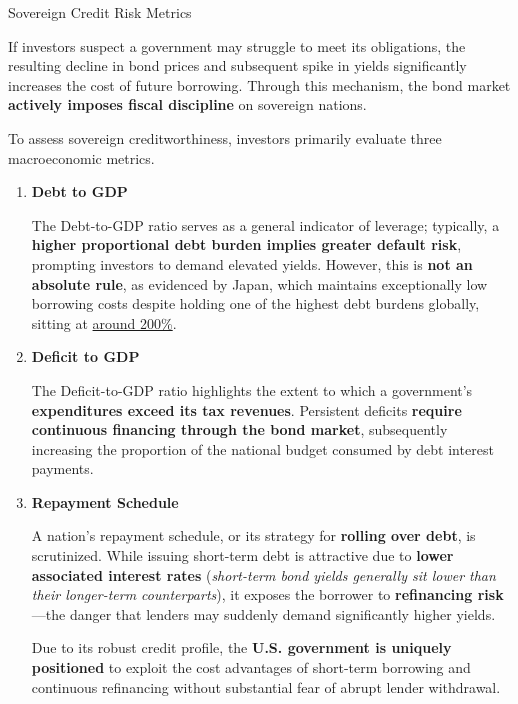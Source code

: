 \documentclass[10pt]{article}
\begin{document}
    \begin{core}{Sovereign Credit Risk Metrics}

      If investors suspect a government may struggle to meet its obligations, the resulting decline in bond prices and subsequent spike in yields significantly increases the cost of future borrowing. Through this mechanism, the bond market \textbf{actively imposes fiscal discipline} on sovereign nations.

      To assess sovereign creditworthiness, investors primarily evaluate three macroeconomic metrics.

      \begin{enumerate}

        \item \textbf{Debt to GDP} 

        The Debt-to-GDP ratio serves as a general indicator of leverage; typically, a \textbf{higher proportional debt burden implies greater default risk}, prompting investors to demand elevated yields. However, this is \textbf{not an absolute rule}, as evidenced by Japan, which maintains exceptionally low borrowing costs despite holding one of the highest debt burdens globally, sitting at \href{https://www.fitchratings.com/research/sovereigns/fitch-affirms-japan-at-a-outlook-stable-19-01-2026}{around 200\%}. 

        \item \textbf{Deficit to GDP}

        The Deficit-to-GDP ratio highlights the extent to which a government's \textbf{expenditures exceed its tax revenues}. Persistent deficits \textbf{require continuous financing through the bond market}, subsequently increasing the proportion of the national budget consumed by debt interest payments. 

        \item \textbf{Repayment Schedule}

        A nation's repayment schedule, or its strategy for \textbf{rolling over debt}, is scrutinized. While issuing short-term debt is attractive due to \textbf{lower associated interest rates} (\textit{short-term bond yields generally sit lower than their longer-term counterparts}), it exposes the borrower to \textbf{refinancing risk}---the danger that lenders may suddenly demand significantly higher yields.

        Due to its robust credit profile, the \textbf{U.S. government is uniquely positioned} to exploit the cost advantages of short-term borrowing and continuous refinancing without substantial fear of abrupt lender withdrawal.

      \end{enumerate}

    \end{core}
\end{document}
